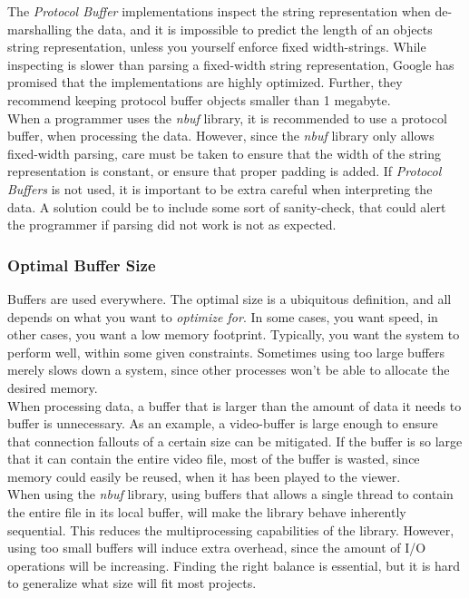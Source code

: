 \documentclass[a4paper]{article}
\newcommand{\nbuf}{\textit{nbuf} }
\begin{document}
The \textit{Protocol Buffer} implementations inspect the string representation when de-marshalling the data, and it is impossible to predict the length of an objects string representation, unless you yourself enforce fixed width-strings. While inspecting is slower than parsing a fixed-width string representation, Google has promised that the implementations are highly optimized. Further, they recommend keeping protocol buffer objects smaller than 1 megabyte.\\

When a programmer uses the \nbuf library, it is recommended to use a protocol buffer, when processing the data. However, since the \nbuf library only allows fixed-width parsing, care must be taken to ensure that the width of the string representation is constant, or ensure that proper padding is added. If \textit{Protocol Buffers} is not used, it is important to be extra careful when interpreting the data. A solution could be to include some sort of sanity-check, that could alert the programmer if parsing did not work is not as expected.


\subsubsection{Optimal Buffer Size}
Buffers are used everywhere. The optimal size is a ubiquitous definition, and all depends on what you want to \textit{optimize for}. In some cases, you want speed, in other cases, you want a low memory footprint. Typically, you want the system to perform well, within some given constraints. Sometimes using too large buffers merely slows down a system, since other processes won't be able to allocate the desired memory.\\

When processing data, a buffer that is larger than the amount of data it needs to buffer is unnecessary. As an example, a video-buffer is large enough to ensure that connection fallouts of a certain size can be mitigated. If the buffer is so large that it can contain the entire video file, most of the buffer is wasted, since memory could easily be reused, when it has been played to the viewer.\\

When using the \nbuf library, using buffers that allows a single thread to contain the entire file in its local buffer, will make the library behave inherently sequential. This reduces the multiprocessing capabilities of the library. However, using too small buffers will induce extra overhead, since the amount of I/O operations will be increasing. Finding the right balance is essential, but it is hard to generalize what size will fit most projects.
\end{document}
